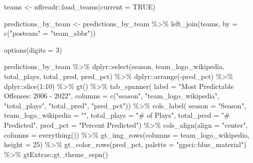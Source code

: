 \documentclass[
  letterpaper,
]{krantz}
\newenvironment{Shaded}{\begin{snugshade}}{\end{snugshade}}
\newcommand{\AttributeTok}[1]{\textcolor[rgb]{0.40,0.45,0.13}{#1}}
\newcommand{\ConstantTok}[1]{\textcolor[rgb]{0.56,0.35,0.01}{#1}}
\newcommand{\DecValTok}[1]{\textcolor[rgb]{0.68,0.00,0.00}{#1}}
\newcommand{\FunctionTok}[1]{\textcolor[rgb]{0.28,0.35,0.67}{#1}}
\newcommand{\NormalTok}[1]{\textcolor[rgb]{0.00,0.23,0.31}{#1}}
\newcommand{\OtherTok}[1]{\textcolor[rgb]{0.00,0.23,0.31}{#1}}
\newcommand{\SpecialCharTok}[1]{\textcolor[rgb]{0.37,0.37,0.37}{#1}}
\newcommand{\StringTok}[1]{\textcolor[rgb]{0.13,0.47,0.30}{#1}}
\begin{document}
\begin{Shaded}
\begin{Highlighting}[]
\NormalTok{teams }\OtherTok{\textless{}{-}}\NormalTok{ nflreadr}\SpecialCharTok{::}\FunctionTok{load\_teams}\NormalTok{(}\AttributeTok{current =} \ConstantTok{TRUE}\NormalTok{)}

\NormalTok{predictions\_by\_team }\OtherTok{\textless{}{-}}\NormalTok{ predictions\_by\_team }\SpecialCharTok{\%\textgreater{}\%}
  \FunctionTok{left\_join}\NormalTok{(teams, }\AttributeTok{by =} \FunctionTok{c}\NormalTok{(}\StringTok{"posteam"} \OtherTok{=} \StringTok{"team\_abbr"}\NormalTok{))}

\FunctionTok{options}\NormalTok{(}\AttributeTok{digits =} \DecValTok{3}\NormalTok{)}

\NormalTok{predictions\_by\_team }\SpecialCharTok{\%\textgreater{}\%}
\NormalTok{  dplyr}\SpecialCharTok{::}\FunctionTok{select}\NormalTok{(season, team\_logo\_wikipedia,}
\NormalTok{                total\_plays, total\_pred, pred\_pct) }\SpecialCharTok{\%\textgreater{}\%}
\NormalTok{  dplyr}\SpecialCharTok{::}\FunctionTok{arrange}\NormalTok{(}\SpecialCharTok{{-}}\NormalTok{pred\_pct) }\SpecialCharTok{\%\textgreater{}\%}
\NormalTok{  dplyr}\SpecialCharTok{::}\FunctionTok{slice}\NormalTok{(}\DecValTok{1}\SpecialCharTok{:}\DecValTok{10}\NormalTok{) }\SpecialCharTok{\%\textgreater{}\%}
  \FunctionTok{gt}\NormalTok{() }\SpecialCharTok{\%\textgreater{}\%}
  \FunctionTok{tab\_spanner}\NormalTok{(}
    \AttributeTok{label =} \StringTok{"Most Predictable Offenses: 2006 {-} 2022"}\NormalTok{,}
    \AttributeTok{columns =} \FunctionTok{c}\NormalTok{(}\StringTok{"season"}\NormalTok{, }\StringTok{"team\_logo\_wikipedia"}\NormalTok{,}
                \StringTok{"total\_plays"}\NormalTok{, }\StringTok{"total\_pred"}\NormalTok{, }\StringTok{"pred\_pct"}\NormalTok{)) }\SpecialCharTok{\%\textgreater{}\%}
  \FunctionTok{cols\_label}\NormalTok{(}
    \AttributeTok{season =} \StringTok{"Season"}\NormalTok{,}
    \AttributeTok{team\_logo\_wikipedia =} \StringTok{""}\NormalTok{,}
    \AttributeTok{total\_plays =} \StringTok{"\# of Plays"}\NormalTok{,}
    \AttributeTok{total\_pred =} \StringTok{"\# Predicted"}\NormalTok{,}
    \AttributeTok{pred\_pct =} \StringTok{"Percent Predicted"}\NormalTok{) }\SpecialCharTok{\%\textgreater{}\%}
  \FunctionTok{cols\_align}\NormalTok{(}\AttributeTok{align =} \StringTok{"center"}\NormalTok{, }\AttributeTok{columns =} \FunctionTok{everything}\NormalTok{()) }\SpecialCharTok{\%\textgreater{}\%}
  \FunctionTok{gt\_img\_rows}\NormalTok{(}\AttributeTok{columns =}\NormalTok{ team\_logo\_wikipedia, }\AttributeTok{height =} \DecValTok{25}\NormalTok{) }\SpecialCharTok{\%\textgreater{}\%}
  \FunctionTok{gt\_color\_rows}\NormalTok{(pred\_pct, }\AttributeTok{palette =} \StringTok{"ggsci::blue\_material"}\NormalTok{) }\SpecialCharTok{\%\textgreater{}\%}
\NormalTok{  gtExtras}\SpecialCharTok{::}\FunctionTok{gt\_theme\_espn}\NormalTok{()}
\end{Highlighting}
\end{Shaded}
\end{document}
